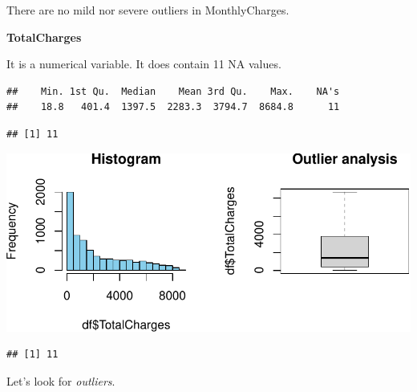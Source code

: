 \documentclass[
  twoside]{article}
\newenvironment{Shaded}{\begin{snugshade}}{\end{snugshade}}
\newcommand{\CommentTok}[1]{\textcolor[rgb]{0.56,0.35,0.01}{\textit{#1}}}
\newcommand{\FloatTok}[1]{\textcolor[rgb]{0.00,0.00,0.81}{#1}}
\newcommand{\FunctionTok}[1]{\textcolor[rgb]{0.00,0.00,0.00}{#1}}
\newcommand{\NormalTok}[1]{#1}
\newcommand{\OtherTok}[1]{\textcolor[rgb]{0.56,0.35,0.01}{#1}}
\newcommand{\SpecialCharTok}[1]{\textcolor[rgb]{0.00,0.00,0.00}{#1}}
\newcommand{\StringTok}[1]{\textcolor[rgb]{0.31,0.60,0.02}{#1}}
\begin{document}
There are no mild nor severe outliers in MonthlyCharges.

\textbf{TotalCharges}

It is a numerical variable. It does contain 11 NA values.

\begin{verbatim}
##    Min. 1st Qu.  Median    Mean 3rd Qu.    Max.    NA's 
##    18.8   401.4  1397.5  2283.3  3794.7  8684.8      11
\end{verbatim}

\begin{verbatim}
## [1] 11
\end{verbatim}

\includegraphics{Assigment2_files/figure-latex/unnamed-chunk-35-1.pdf}

\begin{verbatim}
## [1] 11
\end{verbatim}

Let's look for \emph{outliers}.

\begin{Shaded}
\end{Shaded}
\end{document}
